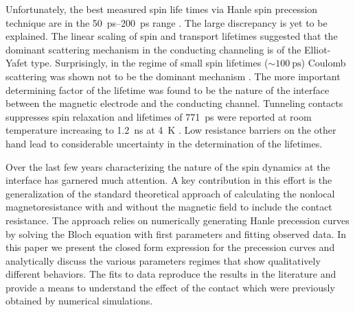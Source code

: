Unfortunately, the best measured spin life times
via Hanle spin precession technique are in the
\SIrange{50}{200}{\pico \second} range
\cite{PhysRevB.80.241403, Tombros2007, PhysRevB.80.214427, PhysRevLett.104.187201}.
The large discrepancy is yet to be explained.
The linear scaling of spin and transport lifetimes
\cite{PhysRevB.80.241403}
suggested that the dominant scattering mechanism in the conducting channeling
is of the Elliot-Yafet
\cite{PhysRev.96.266}
type.
Surprisingly, in the regime of small spin lifetimes
($∼ \SI{100}{\pico \second}$) Coulomb scattering was shown not to be the dominant mechanism
\cite{PhysRevLett.104.187201}.
The more important determining factor of the lifetime
was found to be the nature of the interface between
the magnetic electrode and the conducting channel.
Tunneling contacts suppresses spin relaxation and lifetimes of \SI{771}{\pico \second}
were reported at room temperature increasing to
\SI{1.2}{\nano \second} at \SI{4}{\kelvin}
\cite{PhysRevLett.107.047207}.
Low resistance barriers on the other hand lead to considerable
uncertainty in the determination of the lifetimes.

Over the last few years characterizing the nature of the spin dynamics
at the interface has garnered much attention.
A key contribution in this effort is the generalization of the standard theoretical approach
of calculating the nonlocal magnetoresistance with and without the magnetic field
\cite{PhysRevB.80.214427, PhysRevB.67.052409}
to include the contact resistance.
The approach relies on numerically generating Hanle precession curves
by solving the Bloch equation with first parameters and fitting observed data.
In this paper we present the closed form expression for the precession curves
and analytically discuss the various parameters regimes that show qualitatively different behaviors.
The fits to data reproduce the results in the literature
and provide a means to understand the effect of the contact
which were previously obtained by numerical simulations.

